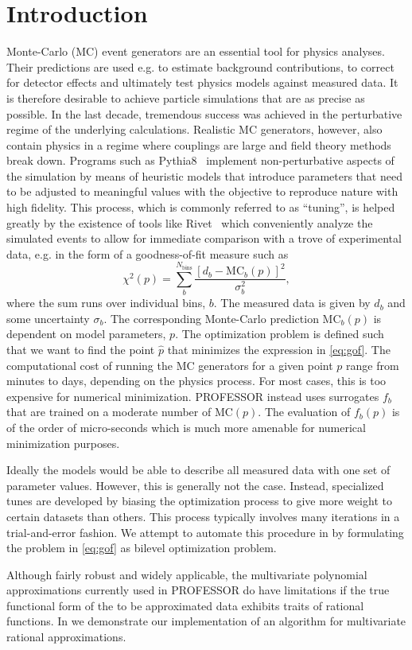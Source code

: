 %
\section{Introduction}
\label{intro}
Monte-Carlo (MC) event generators are an essential tool for physics analyses. Their
predictions are used e.g. to estimate background contributions, to correct for
detector effects and ultimately test physics models against measured data. It
is therefore desirable to achieve particle simulations that are as precise as
possible. In the last decade, tremendous success was achieved in the
perturbative regime of the underlying calculations. Realistic MC generators,
however, also contain physics in a regime where couplings are large and field
theory methods break down.  Programs such as Pythia8~\cite{Sjostrand:2007gs}
implement non-perturbative aspects of the simulation by means of heuristic
models that introduce parameters that need to be adjusted to meaningful values
with the objective to reproduce nature with high fidelity.  This process, which
is commonly referred to as ``tuning'', is helped greatly by the existence of
tools like Rivet~\cite{Buckley:2010ar} which conveniently analyze the simulated
events to allow for immediate comparison with a trove of experimental data,
e.g.  in the form of a goodness-of-fit measure such as
\begin{equation}\label{eq:gof}
    \chi^2(p) = \sum\limits_b^{N_\text{bins}} \frac{\left[d_b - \text{MC}_b(p)\right]^2}{\sigma_b^2},
\end{equation}
where the sum runs over individual bins, $b$. The measured data is given by
$d_b$ and some uncertainty $\sigma_b$. The corresponding Monte-Carlo
prediction $\text{MC}_b(p)$ is dependent on model parameters, $p$.  The
optimization problem is defined such that we want to find the point $\hat{p}$
that minimizes the expression in \eqref{eq:gof}. The computational cost
of running the MC generators for a given point $p$ range from minutes
to days, depending on the physics process. For most cases, this is too
expensive for numerical minimization. PROFESSOR instead uses surrogates $f_b$
that are trained on a moderate number of $\text{MC}(p)$. The evaluation of
$f_b(p)$ is of the order of micro-seconds which is much more amenable for
numerical minimization purposes.

Ideally the models would be able to describe all measured
data with one set of parameter values. However, this is generally not the case. Instead, specialized tunes are developed by biasing the
optimization process to give more weight to certain datasets than others. This
process typically involves many iterations in a trial-and-error fashion. We
attempt to automate this procedure in  by formulating the problem in \eqref{eq:gof} as bilevel optimization problem.

Although fairly robust and widely applicable, the multivariate polynomial approximations
currently used  in PROFESSOR  do have limitations if the true functional form of the
to be approximated data exhibits traits of rational functions. In 
we demonstrate our implementation of an algorithm for multivariate rational
approximations.
